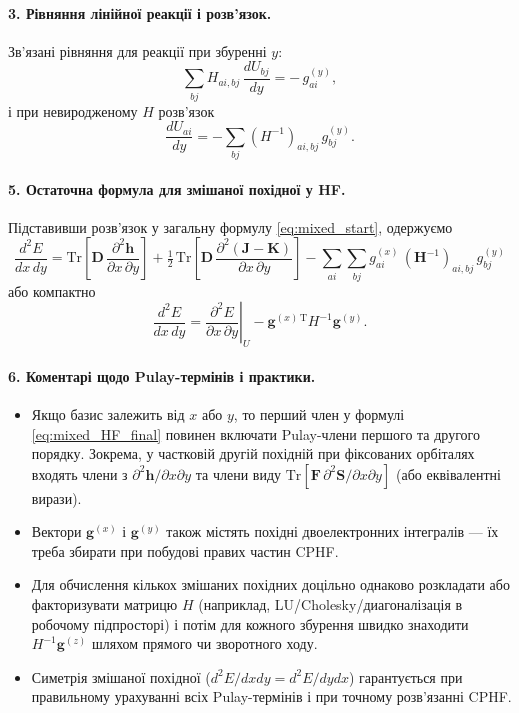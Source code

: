 \paragraph{3. Рівняння лінійної реакції і розв'язок.}
Зв'язані рівняння для реакції при збуренні $y$:
\begin{equation}\label{eq:CPHF_HF_xy}
	\sum_{bj} H_{ai,bj}\,\frac{dU_{bj}}{dy} = -\,g^{(y)}_{ai},
\end{equation}
і при невиродженому $H$ розв'язок
\[
	\frac{dU_{ai}}{dy} = -\sum_{bj}(H^{-1})_{ai,bj}\,g^{(y)}_{bj}.
\]

\paragraph{5. Остаточна формула для змішаної похідної у HF.}
Підставивши розв'язок у загальну формулу \eqref{eq:mixed_start}, одержуємо
\begin{equation}\label{eq:mixed_HF_final}
	\frac{d^2E}{dx\,dy}
	=
	\mathrm{Tr}\!\left[\mathbf D\,\frac{\partial^2\mathbf h}{\partial x\,\partial y}\right]
	+\tfrac12\,\mathrm{Tr}\!\left[\mathbf D\,\frac{\partial^2(\mathbf J-\mathbf K)}{\partial x\,\partial y}\right]
	-
	\sum_{ai}\sum_{bj} g^{(x)}_{ai}\,(\mathbf{H}^{-1})_{ai,bj}\,g^{(y)}_{bj}
\end{equation}
або компактно
\[
	\frac{d^2E}{dx\,dy}
	=
	\left.\frac{\partial^2 E}{\partial x\,\partial y}\right|_{U}
	-
	\mathbf g^{(x)\,\mathrm T} H^{-1}\mathbf g^{(y)}.
\]

\paragraph{6. Коментарі щодо Pulay-термінів і практики.}
\begin{itemize}
	\item Якщо базис залежить від $x$ або $y$, то перший член у формулі \eqref{eq:mixed_HF_final} повинен включати Pulay-члени першого та другого порядку. Зокрема, у частковій другій похідній при фіксованих орбіталях входять члени з $\partial^2\mathbf h/\partial x\partial y$ та члени виду $\mathrm{Tr}[\mathbf F\,\partial^2\mathbf S/\partial x\partial y]$ (або еквівалентні вирази).
	\item Вектори $\mathbf g^{(x)}$ і $\mathbf g^{(y)}$ також містять похідні двоелектронних інтегралів — їх треба збирати при побудові правих частин CPHF.
	\item Для обчислення кількох змішаних похідних доцільно однаково розкладати або факторизувати матрицю $H$ (наприклад, LU/Cholesky/диагоналізація в робочому підпросторі) і потім для кожного збурення швидко знаходити $H^{-1}\mathbf g^{(z)}$ шляхом прямого чи зворотного ходу.
	\item Симетрія змішаної похідної ($d^2E/dxdy = d^2E/dydx$) гарантується при правильному урахуванні всіх Pulay-термінів і при точному розв'язанні CPHF.
\end{itemize}


